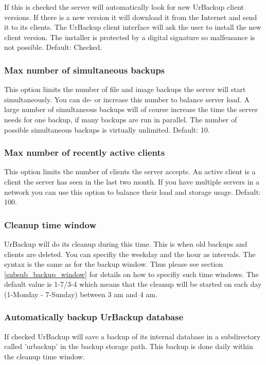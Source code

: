 \documentclass[a4paper,10pt]{article}
\begin{document}
If this is checked the server will automatically look for new UrBackup client versions. If there is a new version it will download it from the Internet and send it to its clients. The UrBackup client interface will ask the user to install the new client version. The installer is protected by a digital signature so malfeasance is not possible. Default: Checked.

\subsubsection{Max number of simultaneous backups}

This option limits the number of file and image backups the server will start simultaneously. You can de- or increase this number to balance server load. A large number of simultaneous backups will of course increase the time the server needs for one backup, if many backups are run in parallel. The number of possible simultaneous backups is virtually unlimited. Default: 10.

\subsubsection{Max number of recently active clients}

This option limits the number of clients the server accepts. An active client is a client the server has seen in the last two month. If you have multiple servers in a network you can use this option to balance their load and storage usage. Default: 100.

\subsubsection{Cleanup time window}

UrBackup will do its cleanup during this time. This is when old backups and clients are deleted. You can specifiy the weekday and the hour as intervals. The syntax is the same as for the backup window. Thus please see section \ref{subsub_backup_window} for details on how to specifiy such time windows.
The default value is 1-7/3-4 which means that the cleanup will be started on each day (1-Monday - 7-Sunday) between 3 am and 4 am.

\subsubsection{Automatically backup UrBackup database}

If checked UrBackup will save a backup of its internal database in a subdirectory called 'urbackup' in the backup storage path. This backup is done daily within the cleanup time window.
\end{document}
